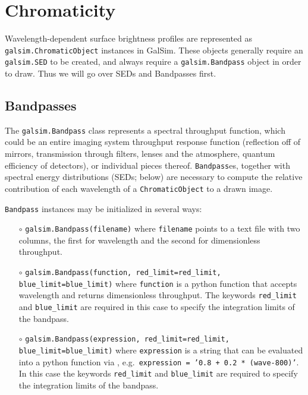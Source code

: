 \documentclass[preprint,11pt]{../../devel/modules/aastex}
\begin{document}
\section{Chromaticity}\label{sect:chromaticity}

Wavelength-dependent surface brightness profiles are represented as
\texttt{galsim.ChromaticObject} instances in GalSim.
These objects generally require an \texttt{galsim.SED} to be created,
and always require a \texttt{galsim.Bandpass} object in order to draw.
Thus we will go over SEDs and Bandpasses first.

\subsection{Bandpasses}

The \texttt{galsim.Bandpass} class represents a spectral throughput function, which could be an
entire imaging system throughput response function (reflection off of mirrors, transmission through
filters, lenses and the atmosphere, quantum efficiency of detectors), or individual pieces thereof.
\texttt{Bandpass}es, together with spectral energy distributions (SEDs; below) are necessary to
compute the relative contribution of each wavelength of a \texttt{ChromaticObject} to a drawn image.

\texttt{Bandpass} instances may be initialized in several ways:
\begin{itemize}
\item[$\circ$] {\tt galsim.Bandpass(filename)} \newline where \texttt{filename} points to a
  text file with two columns, the first for wavelength and the second for dimensionless throughput.
\item[$\circ$] {\tt galsim.Bandpass(function, red\_limit=red\_limit, blue\_limit=blue\_limit)}
  \newline where \texttt{function} is a python function that accepts wavelength and returns
  dimensionless throughput.  The keywords \texttt{red\_limit} and \texttt{blue\_limit} are required in this case
  to specify the integration limits of the bandpass.
\item[$\circ$] {\tt galsim.Bandpass(expression,
    red\_limit=red\_limit,\\
 \phantom{galsim.Bandpass(}blue\_limit=blue\_limit)}
  \newline where \texttt{expression} is a string that can be evaluated into a python function via
  ,
  \newline e.g.\ {\tt expression = '0.8 + 0.2 * (wave-800)'}. In this
  case the keywords \texttt{red\_limit} and
  \texttt{blue\_limit} are required to specify the integration limits of the bandpass.
\end{itemize}
\end{document}
